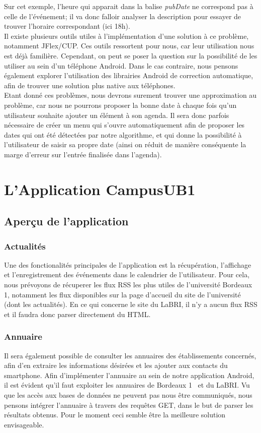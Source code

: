\documentclass [pdftex,12pt] {report}
\def\wl{\par \vspace{\baselineskip}}
\begin{document}
\wl Sur cet exemple, l'heure qui apparait dans la balise \emph{pubDate} ne correspond pas à celle de l'événement; il va donc falloir analyser la description pour essayer de trouver l'horaire correspondant (ici 18h). \\

Il existe plusieurs outils utiles à l'implémentation d'une solution à ce problème, notamment JFlex/CUP. Ces outils ressortent pour nous, car leur utilisation nous est déjà familière. Cependant, on peut se poser la question sur la possibilité de les utiliser au sein d'un téléphone Android. Dans le cas contraire, nous pensons également explorer l'utilisation des librairies Android de correction automatique, afin de trouver une solution plus native aux téléphones. \\
Etant donné ces problèmes, nous devrons surement trouver une approximation au problème, car nous ne pourrons proposer la bonne date à chaque fois qu'un utilisateur souhaite ajouter un élément à son agenda. Il sera donc parfois nécessaire de créer un menu qui s'ouvre automatiquement afin de proposer les dates qui ont été détectées par notre algorithme, et qui donne la possibilité à l'utilisateur de saisir sa propre date (ainsi on réduit de manière conséquente la marge d'erreur sur l'entrée finalisée dans l'agenda). \\



\chapter{L'Application CampusUB1}
\section{Aperçu de l'application}

\subsection{Actualités}
Une des fonctionalités principales de l'application est la récupération, l'affichage et l'enregistrement des événements dans le calendrier de l'utilisateur. 
Pour cela, nous prévoyons de récuperer les flux RSS les plus utiles de l'université Bordeaux 1\cite{fluxBDX1}, notamment les flux disponibles sur la page d'accueil du site de l'université (dont les actualités).
En ce qui concerne le site du LaBRI, il n'y a aucun flux RSS et il faudra donc parser directement du HTML.

\subsection{Annuaire}
Il sera également possible de consulter les annuaires des établissements concernés, afin d'en extraire les informations désirées et les ajouter aux contacts du smartphone.
Afin d'implémenter l'annuaire au sein de notre application Android, il est évident qu'il faut exploiter les annuaires de Bordeaux 1~\cite{AnnuaireBdx1} et du LaBRI. Vu que les accès aux bases de données ne peuvent pas nous être communiqués, nous pensons intégrer l'annuaire à travers des requêtes GET, dans le but de parser les résultats obtenus. Pour le moment ceci semble être la meilleure solution envisageable.
\end{document}
